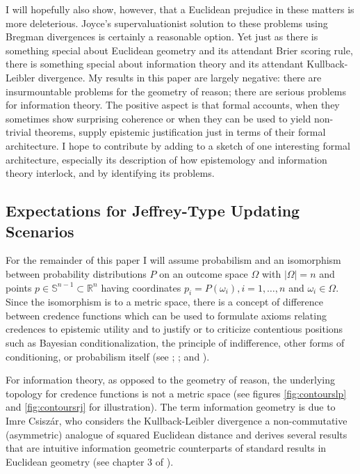 \documentclass[smallextended]{svjour3}       %
\begin{document}
I will hopefully also show, however, that a Euclidean prejudice in
these matters is more deleterious. Joyce's supervaluationist solution
to these problems using Bregman divergences is certainly a reasonable
option. Yet just as there is something special about Euclidean
geometry and its attendant Brier scoring rule, there is something
special about information theory and its attendant Kullback-Leibler
divergence. My results in this paper are largely negative: there are
insurmountable problems for the geometry of reason; there are serious
problems for information theory. The positive aspect is that formal
accounts, when they sometimes show surprising coherence or when they
can be used to yield non-trivial theorems, supply epistemic
justification just in terms of their formal architecture. I hope to
contribute by adding to a sketch of one interesting formal
architecture, especially its description of how epistemology and
information theory interlock, and by identifying its problems.

\subsection{Expectations for Jeffrey-Type Updating Scenarios}
\label{subsec:vidiedoo}

For the remainder of this paper I will assume probabilism and an
isomorphism between probability distributions $P$ on an outcome space
$\Omega$ with $|\Omega|=n$ and points
$p\in\mathbb{S}^{n-1}\subset\mathbb{R}^{n}$ having coordinates
$p_{i}=P(\omega_{i}),i=1,\ldots,n$ and $\omega_{i}\in{}\Omega$. Since
the isomorphism is to a metric space, there is a concept of difference
between credence functions which can be used to formulate axioms
relating credences to epistemic utility and to justify or to criticize
contentious positions such as Bayesian conditionalization, the
principle of indifference, other forms of conditioning, or probabilism
itself (see ; ;
and ).

For information theory, as opposed to the geometry of reason, the
underlying topology for credence functions is not a metric space (see
figures \ref{fig:contourslp} and \ref{fig:contoursrj} for
illustration). The term information geometry is due to Imre
Csisz{\'a}r, who considers the Kullback-Leibler divergence a
non-commutative (asymmetric) analogue of squared Euclidean distance
and derives several results that are intuitive information geometric
counterparts of standard results in Euclidean geometry (see chapter 3
of ).
\end{document}
